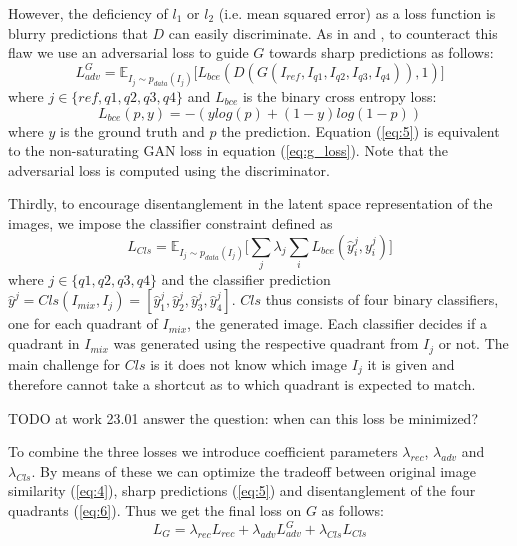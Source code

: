 \documentclass[11pt,a4paper]{article}
\begin{document}
However, the deficiency of $l_1$ or $l_2$ (i.e. mean squared error) as a loss function is blurry predictions that $D$ can easily discriminate. As in \cite{1711.07410} and \cite{1511.05440}, to counteract this flaw we use an adversarial loss to guide $G$ towards sharp predictions as follows:
\begin{equation} \label{eq:5}
    L^G_{adv} = \mathbb{E}_{I_{j}\sim p_{data} (I_{j})}\big[ L_{bce}(D(G(I_{ref},I_{q1},I_{q2},I_{q3},I_{q4})), 1)\big]
\end{equation}
where $j \in \{ref,q1,q2,q3,q4\}$ and $L_{bce}$ is the binary cross entropy loss:
\begin{equation} \label{eq:6}
    L_{bce}(p, y) = -(ylog(p) + (1 - y)log(1-p))
\end{equation}
where $y$ is the ground truth and $p$ the prediction. Equation (\ref{eq:5}) is equivalent to the non-saturating GAN loss in equation (\ref{eq:g_loss}). Note that the adversarial loss is computed using the discriminator.

Thirdly, to encourage disentanglement in the latent space representation of the images, we impose the classifier constraint defined as
\begin{equation} \label{eq:7}
    L_{Cls} = \mathbb{E}_{I_{j}\sim p_{data} (I_{j})}\big[\sum_{j} \lambda_j \sum_{i} L_{bce}(\hat{y}^j_i, y^j_i)\big]
\end{equation}
where $j \in \{q1,q2,q3,q4\}$ and the classifier prediction $\hat{y}^j = Cls(I_{mix}, I_j) = [\hat{y}^j_1, \hat{y}^j_2, \hat{y}^j_3, \hat{y}^j_4]$. $Cls$ thus consists of four binary classifiers, one for each quadrant of $I_{mix}$, the generated image. Each classifier decides if a quadrant in $I_{mix}$ was generated using the respective quadrant from $I_j$ or not. The main challenge for $Cls$ is it does not know which image $I_j$ it is given and therefore cannot take a shortcut as to which quadrant is expected to match.

TODO at work 23.01 answer the question: when can this loss be minimized?


To combine the three losses we introduce coefficient parameters $\lambda_{rec}$, $\lambda_{adv}$ and $\lambda_{Cls}$. By means of these we can optimize the tradeoff between original image similarity (\ref{eq:4}), sharp predictions (\ref{eq:5}) and disentanglement of the four quadrants (\ref{eq:6}). Thus we get the final loss on $G$ as follows:
\begin{equation} \label{eq:g_loss_comp}
    L_{G} = \lambda_{rec} L_{rec} + \lambda_{adv} L^G_{adv} + \lambda_{Cls} L_{Cls}
\end{equation}
\end{document}
